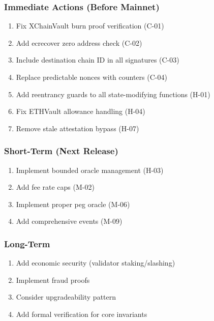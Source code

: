 \documentclass[
]{article}
\providecommand{\tightlist}{%
  \setlength{\itemsep}{0pt}\setlength{\parskip}{0pt}}
\begin{document}
\subsubsection{Immediate Actions (Before
Mainnet)}\label{immediate-actions-before-mainnet}

\begin{enumerate}
\def\labelenumi{\arabic{enumi}.}
\tightlist
\item
  Fix XChainVault burn proof verification (C-01)
\item
  Add ecrecover zero address check (C-02)
\item
  Include destination chain ID in all signatures (C-03)
\item
  Replace predictable nonces with counters (C-04)
\item
  Add reentrancy guards to all state-modifying functions (H-01)
\item
  Fix ETHVault allowance handling (H-04)
\item
  Remove stale attestation bypass (H-07)
\end{enumerate}

\subsubsection{Short-Term (Next Release)}\label{short-term-next-release}

\begin{enumerate}
\def\labelenumi{\arabic{enumi}.}
\tightlist
\item
  Implement bounded oracle management (H-03)
\item
  Add fee rate caps (M-02)
\item
  Implement proper peg oracle (M-06)
\item
  Add comprehensive events (M-09)
\end{enumerate}

\subsubsection{Long-Term}\label{long-term}

\begin{enumerate}
\def\labelenumi{\arabic{enumi}.}
\tightlist
\item
  Add economic security (validator staking/slashing)
\item
  Implement fraud proofs
\item
  Consider upgradeability pattern
\item
  Add formal verification for core invariants
\end{enumerate}
\end{document}
